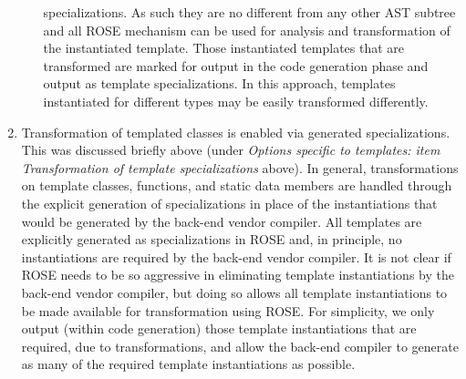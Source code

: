 \begin{enumerate}
\begin{itemize}
                     specializations. As such they are no different from any other AST
                     subtree and all ROSE mechanism can be used for analysis and
                     transformation of the instantiated template.  Those instantiated 
                     templates that are transformed are marked for output in the 
                     code generation phase and output as template specializations.
                     In this approach, templates instantiated for different types
                     may be easily transformed differently.
          \end{itemize}

     \item Transformation of templated classes is enabled via generated specializations. \\
           This was discussed briefly above (under {\em Options specific to templates:
           item Transformation of template specializations} above).  In general,
           transformations on template classes, functions, and static data members are
           handled through the explicit generation of specializations in place of the 
           instantiations that would be generated by the back-end vendor compiler.  All 
           templates are explicitly generated as specializations in ROSE and, in principle, 
           no instantiations are required by the back-end vendor compiler.  It is not clear
           if ROSE needs to be so aggressive in eliminating template instantiations by the
           back-end vendor compiler, but doing so allows all template instantiations to be
           made available for transformation using ROSE.  For simplicity, we only output
           (within code generation) those template instantiations that are required, due 
           to transformations, and 
           allow the back-end compiler to generate as many of the required template 
           instantiations as possible.


\end{enumerate}
